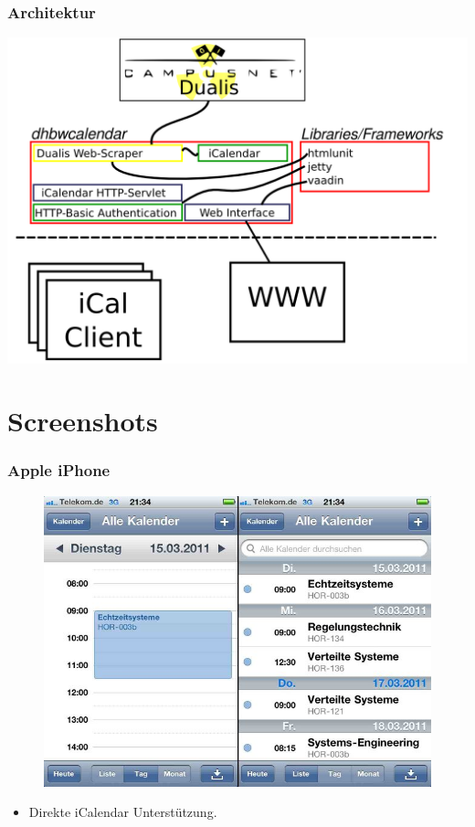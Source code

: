 \documentclass{beamer}
\begin{document}
\begin{frame}\frametitle{Architektur}
\includegraphics[width=0.8\paperwidth]{images/arch.png}
\end{frame}

\section{Screenshots}
\begin{frame}\frametitle{Apple iPhone}
  \begin{figure}
    \centering
    \includegraphics[height=0.6\paperheight]{images/dhbwcalendar-iphone.jpg}
  \end{figure}
  \begin{itemize}
    \item Direkte iCalendar Unterstützung.
  \end{itemize}
\end{frame}
\end{document}
